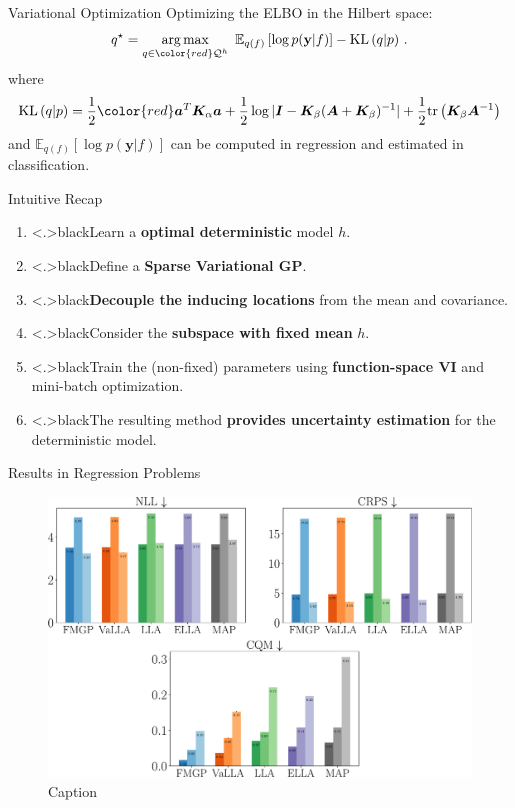 \documentclass[aspectratio=149]{beamer}
\DeclareMathOperator*{\argmax}{arg\,max}
\begin{document}
    \begin{frame}{Variational Optimization}
        Optimizing the ELBO in the Hilbert space:
        \[
        q^\star = \argmax_{q \in {\color{red}\mathcal{Q}^h}}\ \mathbb{E}_{q(f)} \left[ \log p(\mathbf{y}|f)\right] - \text{KL}\left(q| p\right)\,.
        \]
        where
        \[
            \begin{aligned}
                \text{KL}\left(q | p\right) = \frac{1}{2} {\color{red}\bm{a}^T \bm{K}_{\alpha} \bm{a}} + \frac{1}{2} \log |\bm{I} - \bm{K}_{\beta} (\bm{A} + \bm{K}_{\beta})^{-1}| + \frac{1}{2} \text{tr}\left( \bm{K}_\beta\bm{A}^{-1} \right)
            \end{aligned}
        \]
        and \(\mathbb{E}_{q(f)}\left[ \log p(\mathbf{y}|f)\right] \) can be computed in regression and estimated in classification.
    \end{frame}

    \begin{frame}{Intuitive Recap}
        \begin{enumerate}[<+->]\color{shadecolor}
            \item \color<.>{black}Learn a \textbf{optimal deterministic} model \(h\).
            \item \color<.>{black}Define a \textbf{Sparse Variational GP}.
            \item \color<.>{black}\textbf{Decouple the inducing locations} from the mean and covariance.
            \item \color<.>{black}Consider the \textbf{subspace with fixed mean} \(h\).
            \item \color<.>{black}Train the (non-fixed) parameters using \textbf{function-space VI} and mini-batch optimization.
            \item \color<.>{black}The resulting method \textbf{provides uncertainty estimation} for the deterministic model.
        \end{enumerate}
    \end{frame}
    
    \begin{frame}{Results in Regression Problems}
    \begin{figure}
        \centering
        \includegraphics[width=0.9\linewidth]{slides_imgs/regression_3.pdf}
        \caption{Caption}
        \label{fig:enter-label}
    \end{figure}
    \end{frame}
\end{document}
